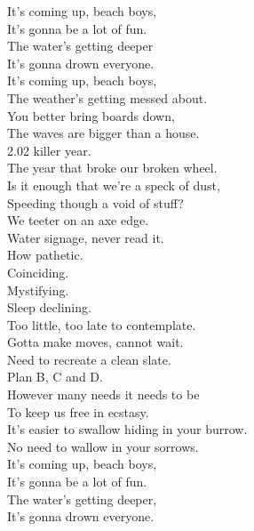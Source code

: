 It's coming up, beach boys, \\
It's gonna be a lot of fun. \\
The water's getting deeper \\
It's gonna drown everyone. \\
It's coming up, beach boys, \\
The weather's getting messed about. \\
You better bring boards down, \\
The waves are bigger than a house. \\

2.02 killer year. \\
The year that broke our broken wheel. \\
Is it enough that we're a speck of dust, \\
Speeding though a void of stuff? \\
We teeter on an axe edge. \\

Water signage, never read it. \\
How pathetic. \\
Coinciding. \\
Mystifying. \\
Sleep declining. \\
Too little, too late to contemplate. \\
Gotta make moves, cannot wait. \\
Need to recreate a clean slate. \\
Plan B, C and D. \\
However many needs it needs to be \\
To keep us free in ecstasy. \\
It's easier to swallow hiding in your burrow. \\
No need to wallow in your sorrows. \\

It's coming up, beach boys, \\
It's gonna be a lot of fun. \\
The water's getting deeper, \\
It's gonna drown everyone. \\





